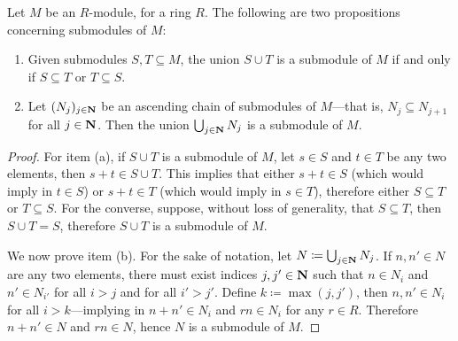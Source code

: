 \begin{example}
\label{exp:union-submodules}
Let \(M\) be an \(R\)-module, for a ring \(R\). The following are two
propositions concerning submodules of \(M\):
\begin{enumerate}\setlength\itemsep{0em}
\item Given submodules \(S, T \subseteq M\), the union \(S \cup T\) is a
  submodule of \(M\) if and only if \(S \subseteq T\) or \(T \subseteq S\).
\item Let \((N_j)_{j \in \mathbf{N}}\) be an ascending chain of submodules of
  \(M\)---that is, \(N_j \subseteq N_{j+1}\) for all \(j \in \mathbf{N}\). Then the
  union \(\bigcup_{j \in \mathbf{N}} N_j\) is a submodule of \(M\).
\end{enumerate}
\begin{proof}
For item (a), if \(S \cup T\) is a submodule of \(M\),
let \(s \in S\) and \(t \in T\) be any two elements, then
\(s + t \in S \cup T\). This implies that either \(s + t \in S\) (which would
imply in \(t \in S\)) or \(s + t \in T\) (which would imply in \(s \in T\)),
therefore either \(S \subseteq T\) or \(T \subseteq S\). For the converse,
suppose, without loss of generality, that \(S \subseteq T\), then \(S \cup T =
S\), therefore \(S \cup T\) is a submodule of \(M\).

We now prove item (b). For the sake of notation, let
\(N \coloneq \bigcup_{j \in \mathbf{N}} N_j\). If \(n, n' \in N\) are any two elements,
there must exist indices \(j, j' \in \mathbf{N}\) such that \(n \in N_i\) and
\(n' \in N_{i'}\) for all \(i > j\) and for all \(i' > j'\). Define
\(k \coloneq \max(j, j')\), then \(n, n' \in N_i\) for all \(i > k\)---implying
in \(n + n' \in N_i\) and \(r n \in N_i\) for any \(r \in R\). Therefore
\(n + n' \in N\) and \(r n \in N\), hence \(N\) is a submodule of \(M\).
\end{proof}
\end{example}


